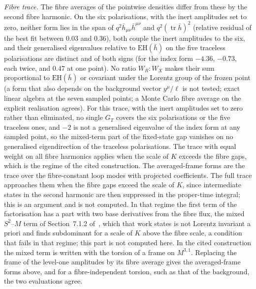 \emph{Fibre trace.} The fibre averages of the pointwise densities differ from these by the second fibre harmonic. On the six polarisations, with the inert amplitudes set to zero, neither form lies in the span of \(q^2\bar h_{\mu\nu}\bar h^{\mu\nu}\) and \(q^2(\operatorname{tr}\bar h)^2\) (relative residual of the best fit between \(0.03\) and \(0.36\)), both couple the inert amplitudes to the six, and their generalised eigenvalues relative to \(\mathrm{EH}(\bar h)\) on the five traceless polarisations are distinct and of both signs (for the index form \(-4.36\), \(-0.73\), each twice, and \(0.47\) at one point). No ratio \(W_R:W_X\) makes their sum proportional to \(\mathrm{EH}(\bar h)\) or covariant under the Lorentz group of the frozen point (a form that also depends on the background vector \(y^\mu/\ell\) is not tested; exact linear algebra at the seven sampled points; a Monte Carlo fibre average on the explicit realisation agrees). For this trace, with the inert amplitudes set to zero rather than eliminated, no single \(G_T\) covers the six polarisations or the five traceless ones, and \(-2\) is not a generalised eigenvalue of the index form at any sampled point, so the mixed-term part of the fixed-state gap vanishes on no generalised eigendirection of the traceless polarisations. The trace with equal weight on all fibre harmonics applies when the scale of \(K\) exceeds the fibre gaps, which is the regime of the cited construction. The averaged-frame forms are the trace over the fibre-constant loop modes with projected coefficients. The full trace approaches them when the fibre gaps exceed the scale of \(K\), since intermediate states in the second harmonic are then suppressed in the proper-time integral; this is an argument and is not computed. In that regime the first term of the factorisation has a part with two base derivatives from the fibre flux, the mixed \(S^2\)--\(M\) term of Section~7.1.2 of~\cite{Steinacker2023}, which that work states is not Lorentz invariant a priori and finds subdominant for a scale of \(K\) above the fibre scale, a condition that fails in that regime; this part is not computed here. In the cited construction the mixed term is written with the torsion of a frame on \(M^{3,1}\). Replacing the frame of the level-one amplitudes by its fibre average gives the averaged-frame forms above, and for a fibre-independent torsion, such as that of the background, the two evaluations agree.

